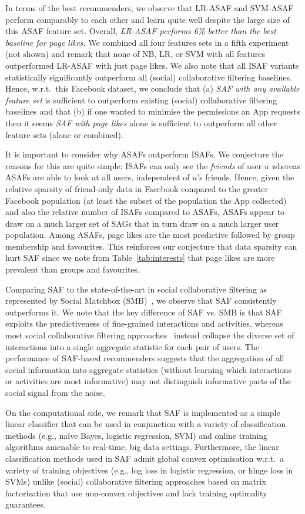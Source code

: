 In terms of the best recommenders, we observe that LR-ASAF and
SVM-ASAF perform comparably to each other and learn quite well despite
the large size of this ASAF feature set.  Overall, \emph{LR-ASAF
  performs 6\% better than the best baseline for page likes}.  We
combined all four features sets in a fifth experiment (not shown) and
remark that none of NB, LR, or SVM with all features outperformed
LR-ASAF with just page likes.  We also note that all ISAF variants
statistically significantly outperform all (social) collaborative
filtering baselines.  Hence, w.r.t.\ this Facebook dataset, we
conclude that (a) \emph{SAF with any available feature set} is sufficient
to outperform existing (social) collaborative filtering baselines and
that (b) if one wanted to minimise the permissions an App requests
then it seems \emph{SAF with page likes} alone is sufficient to
outperform all other feature sets (alone or combined).

It is important to consider why ASAFs outperform ISAFs.  We conjecture
the reasons for this are quite simple: ISAFs can only see the
\emph{friends} of user $u$ whereas ASAFs are able to look at all
users, independent of $u$'s friends.  Hence, given the relative
sparsity of friend-only data in Facebook compared to the greater
Facebook population (at least the subset of the population the App
collected) and also the relative number of ISAFs compared to ASAFs,
ASAFs appear to draw on a much larger set of SAGs that in turn draw on
a much larger user population.  Among ASAFs, page likes are the most
predictive followed by group membership and favourites.  This
reinforces our conjecture that data sparsity can hurt SAF since we
note from Table~\ref{tab:interests} that page likes are more prevalent
than groups and favourites.

Comparing SAF to the state-of-the-art in social collaborative
filtering as represented by Social Matchbox (SMB)~\cite{Noel2012NOF},
we observe that SAF consistently outperforms it.  We note that the key
difference of SAF vs. SMB is that SAF exploits the predictiveness of
fine-grained interactions and activities, whereas most
social collaborative filtering
approaches~\cite{socinf,rrmf,ste,sorec,sr,Noel2012NOF,lla} instead
collapse the diverse set of interactions into a single aggregate
statistic for each pair of users.  The performance of SAF-based
recommenders suggests that the aggregation of all social information
into aggregate statistics (without learning which interactions or
activities are most informative) may not distinguish informative 
parts of the social signal from the noise.

On the computational side, we remark that SAF is implemented as a
simple linear classifier that can be used in conjunction with a
variety of classification methods (e.g., na\"{i}ve Bayes, logistic
regression, SVM) and online training algorithms amenable to real-time,
big data settings.  Furthermore, the linear classification methods
used in SAF admit global convex optimisation w.r.t.\ a variety of
training objectives (e.g., log loss in logistic regression, or hinge
loss in SVMs) unlike (social) collaborative filtering approaches based
on matrix factorization that use non-convex objectives and lack training
optimality guarantees.


